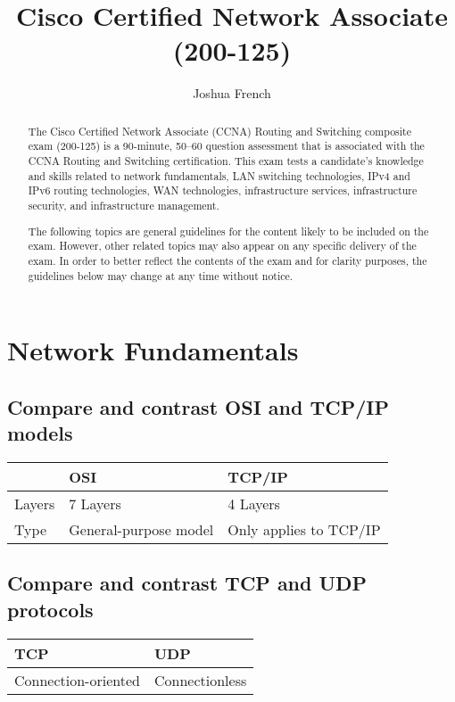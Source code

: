 \documentclass[10pt]{article}
\begin{document}
\title{Cisco Certified Network Associate (200-125)}
\author{Joshua French}
\date{\vspace{-5ex}}

\maketitle

\renewcommand{\abstractname}{Exam Description}
\begin{abstract}
The Cisco Certified Network Associate (CCNA) Routing and Switching composite
exam (200-125) is a 90-minute, 50–60 question assessment that is associated with the CCNA Routing
and Switching certification. This exam tests a candidate's knowledge and skills related to network
fundamentals, LAN switching technologies, IPv4 and IPv6 routing technologies, WAN technologies,
infrastructure services, infrastructure security, and infrastructure management.

The following topics are general guidelines for the content likely to be included on the exam. However,
other related topics may also appear on any specific delivery of the exam. In order to better reflect the
contents of the exam and for clarity purposes, the guidelines below may change at any time without
notice.
\end{abstract}

\tableofcontents

\newpage
\section{Network Fundamentals}

\subsection{Compare and contrast OSI and TCP/IP models}
\begin{tabular}{@{}lll@{}}
\toprule
& OSI & TCP/IP \\ \midrule
Layers & 7 Layers & 4 Layers \\
Type & General-purpose model & Only applies to TCP/IP \\
\bottomrule
\end{tabular}

\subsection{Compare and contrast TCP and UDP protocols}
\begin{tabular}{@{}ll@{}}
\toprule
TCP & UDP \\ \midrule
Connection-oriented & Connectionless \\
\bottomrule
\end{tabular}
\end{document}
